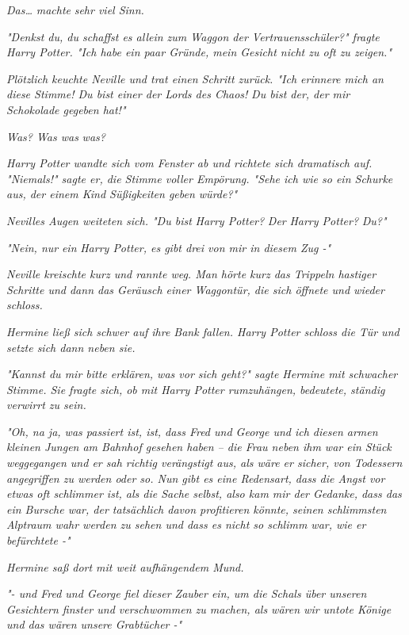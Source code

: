 {\emph{Das…} \emph{\emph{machte}} \emph{sehr viel Sinn.}

\emph{"Denkst du, du schaffst es allein zum Waggon der Vertrauensschüler?" fragte Harry Potter. "Ich habe ein paar Gründe, mein Gesicht nicht zu oft zu zeigen."}

\emph{Plötzlich keuchte Neville und trat einen Schritt zurück. "Ich erinnere mich an diese Stimme! Du bist einer der Lords des Chaos!} \emph{\emph{Du bist der, der mir Schokolade gegeben hat!}"}

\emph{Was? Was was} \emph{\emph{was?}}

\emph{Harry Potter wandte sich vom Fenster ab und richtete sich dramatisch auf. "\emph{Niemals!}" sagte er, die Stimme voller Empörung. "Sehe ich wie so ein Schurke aus, der einem Kind Süßigkeiten geben würde?"}

\emph{Nevilles Augen weiteten sich. "\emph{Du bist}} \emph{Harry Potter?} \emph{\emph{Der}} \emph{Harry Potter?} \emph{\emph{Du?}"}

\emph{"Nein, nur} \emph{\emph{ein}} \emph{Harry Potter, es gibt drei von mir in diesem Zug -"}

\emph{Neville kreischte kurz und rannte weg. Man hörte kurz das Trippeln hastiger Schritte und dann das Geräusch einer Waggontür, die sich öffnete und wieder schloss.}

\emph{Hermine ließ sich schwer auf ihre Bank fallen. Harry Potter schloss die Tür und setzte sich dann neben sie.}

\emph{"Kannst du mir bitte erklären, was vor sich geht?" sagte Hermine mit schwacher Stimme. Sie fragte sich, ob mit Harry Potter rumzuhängen, bedeutete, ständig verwirrt zu sein.}

\emph{"Oh, na ja, was passiert ist, ist, dass Fred und George und ich diesen armen kleinen Jungen am Bahnhof gesehen haben -- die Frau neben ihm war ein Stück weggegangen und er sah richtig verängstigt aus, als wäre er sicher, von Todessern angegriffen zu werden oder so. Nun gibt es eine Redensart, dass die Angst vor etwas oft schlimmer ist, als die Sache selbst, also kam mir der Gedanke, dass das ein Bursche war, der tatsächlich davon profitieren könnte, seinen schlimmsten Alptraum wahr werden zu sehen und dass es nicht so schlimm war, wie er befürchtete -"}

\emph{Hermine saß dort mit weit aufhängendem Mund.}

\emph{"- und Fred und George fiel dieser Zauber ein, um die Schals über unseren Gesichtern finster und verschwommen zu machen, als wären wir untote Könige und das wären unsere Grabtücher -"}

}
